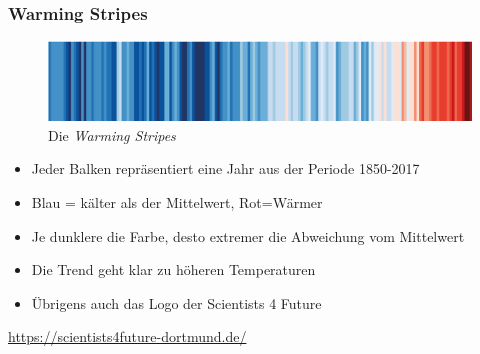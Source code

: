 

\begin{frame}
	\frametitle{Warming Stripes}

	\begin{figure}
		\centering
		\includegraphics[width=\linewidth]{bilder/s4f-warming-stripes}
		\caption{Die \textit{Warming Stripes}}
		\label{fig:s4f-warming-stripes}
	\end{figure}
	\begin{itemize}
		\item Jeder Balken repräsentiert eine Jahr aus der Periode 1850-2017
		\item Blau = kälter als der Mittelwert, Rot=Wärmer
		\item Je dunklere die Farbe, desto extremer die Abweichung vom Mittelwert
		\item Die Trend geht klar zu höheren Temperaturen
		\item Übrigens auch das Logo der Scientists 4 Future
	\end{itemize}
	\begin{center}
		\url{https://scientists4future-dortmund.de/}
	\end{center}

\end{frame}

